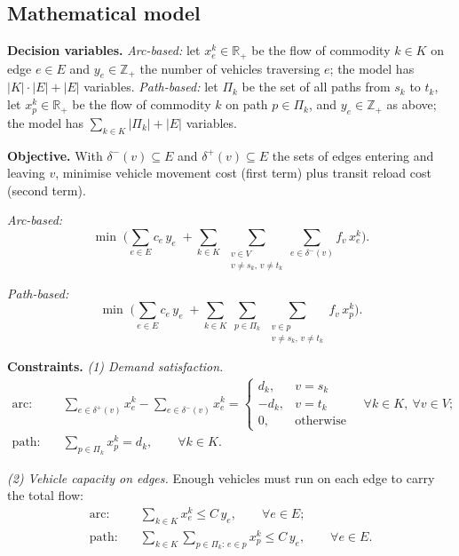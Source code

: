 \documentclass[runningheads]{llncs}
\newcommand{\E}{E}
\newcommand{\Vv}{V}
\newcommand{\Real}{\mathbb{R}}
\newcommand{\Int}{\mathbb{Z}}
\begin{document}
\subsection{Mathematical model}
\textbf{Decision variables.} \emph{Arc-based:} let $x^k_e\in\Real_+$ be the flow
of commodity $k\in K$ on edge $e\in \E$ and $y_e\in\Int_+$ the number of vehicles
traversing $e$; the model has $|K|\cdot|\E|+|\E|$ variables. \emph{Path-based:}
let $\Pi_k$ be the set of all paths from $s_k$ to $t_k$, let $x^k_p\in\Real_+$ be
the flow of commodity $k$ on path $p\in\Pi_k$, and $y_e\in\Int_+$ as above; the
model has $\sum_{k\in K}|\Pi_k|+|\E|$ variables.

\smallskip\noindent\textbf{Objective.} With $\delta^-(v)\subseteq \E$ and
$\delta^+(v)\subseteq \E$ the sets of edges entering and leaving $v$, minimise
vehicle movement cost (first term) plus transit reload cost (second term).

\noindent\emph{Arc-based:}
\begin{equation}
\min\;\Bigg(\sum_{e\in \E} c_e\,y_e
 \;+\!\!\sum_{k\in K}\;\sum_{\substack{v\in \Vv\\ v\neq s_k,\,v\neq t_k}}
 \sum_{e\in\delta^-(v)} f_v\,x^k_e\Bigg).
\label{eq:obj-arc}
\end{equation}

\noindent\emph{Path-based:}
\begin{equation}
\min\;\Bigg(\sum_{e\in \E} c_e\,y_e
 \;+\!\!\sum_{k\in K}\;\sum_{p\in\Pi_k}\;
 \sum_{\substack{v\in p\\ v\neq s_k,\,v\neq t_k}} f_v\,x^k_p\Bigg).
\label{eq:obj-path}
\end{equation}

\smallskip\noindent\textbf{Constraints.} \emph{(1) Demand satisfaction.}
\begin{align}
\text{arc:}\quad
&\sum_{e\in\delta^+(v)} x^k_e-\sum_{e\in\delta^-(v)} x^k_e=
 \begin{cases} d_k, & v=s_k\\ -d_k, & v=t_k\\ 0, & \text{otherwise}\end{cases}
 \quad \forall k\in K,\ \forall v\in \Vv;
 \label{eq:demand-arc}\\[2pt]
\text{path:}\quad
&\sum_{p\in\Pi_k} x^k_p=d_k, \qquad \forall k\in K.
\label{eq:demand-path}
\end{align}

\noindent\emph{(2) Vehicle capacity on edges.} Enough vehicles must run on each
edge to carry the total flow:
\begin{align}
\text{arc:}\quad &\sum_{k\in K} x^k_e\le C\,y_e, \qquad \forall e\in \E;
\label{eq:cap-arc}\\
\text{path:}\quad &\sum_{k\in K}\sum_{p\in\Pi_k:\,e\in p} x^k_p\le C\,y_e,
\qquad \forall e\in \E.
\label{eq:cap-path}
\end{align}
\end{document}
